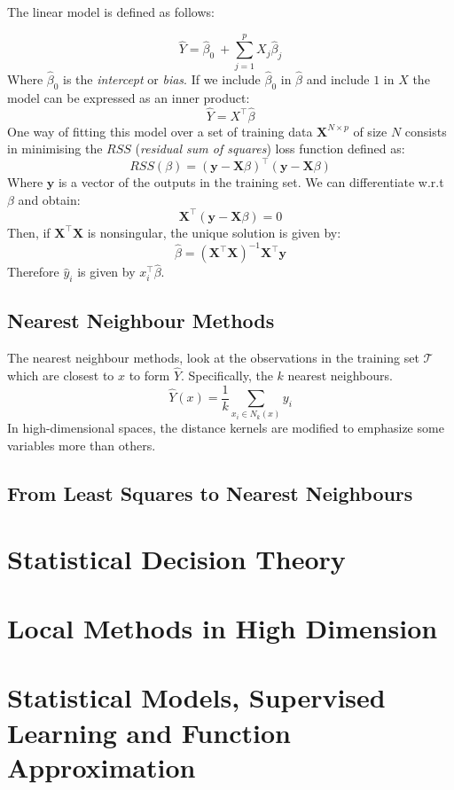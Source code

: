\documentclass[12pt]{article}
\newcommand{\X}{{\bm{X}}}
\begin{document}
The linear model is defined as follows:

$$
\hat{Y} = \hat{\beta}_0 \ + \sum\limits_{j=1}^p X_j \hat{\beta}_j
$$
%
Where $\hat{\beta}_0$ is the \textit{intercept} or \textit{bias}. If we include $\hat{\beta}_0$ in $\hat{\beta}$ and include $1$ in $X$ the model can be expressed as an inner product:
%
$$
\hat{Y} = X^\top \hat{\beta}
$$
%
One way of fitting this model over a set of training data $\X^{N \times p}$ of size $N$ consists in minimising the $RSS$ (\textit{residual sum of squares}) loss function defined as:
%
$$
RSS(\beta) = (\bm{y} - \X \beta)^\top (\bm{y} - \X \beta)
$$
%
Where $\bm{y}$ is a vector of the outputs in the training set. We can differentiate w.r.t $\beta$ and obtain:
%
$$
\X^\top (\bm{y} - \X \beta) = 0
$$
%
Then, if $\X^\top\X$ is nonsingular, the unique solution is given by:
%
$$
\hat{\beta} = (\X^\top\X)^{-1}\X^\top\bm{y}
$$
%
Therefore $\hat{y}_i$ is given by $x^\top_{i} \hat{\beta}$.

\subsection{Nearest Neighbour Methods}

The nearest neighbour methods, look at the observations in the training set $\mathcal{T}$ which are closest to $x$ to form $\hat{Y}$. Specifically, the $k$ nearest neighbours.
%
$$
\hat{Y}(x) = \frac{1}{k} \sum\limits_{x_i \in N_k(x)} y_i
$$
In high-dimensional spaces, the distance kernels are modified to emphasize some variables more than others.

\subsection{From Least Squares to Nearest Neighbours}

\section{Statistical Decision Theory}

\section{Local Methods in High Dimension}

\section{Statistical Models, Supervised Learning and Function Approximation}
\end{document}
